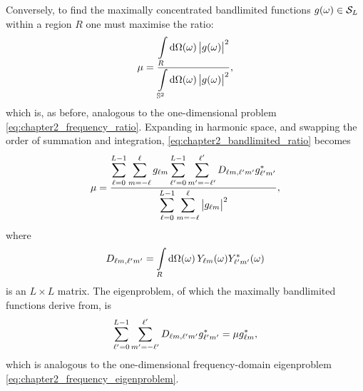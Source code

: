 Conversely, to find the maximally concentrated bandlimited functions \(\pixel{g} \in \spaceBandlimit{}\) within a region \(R\) one must maximise the ratio:
%
\begin{equation}\label{eq:chapter2_bandlimited_ratio}
	\mu
	= \frac{\integrateRegion{\sphereVolume} \abs{\pixel{g}}^{2}}
	{\integrateSphere{\omega} \abs{\pixel{g}}^{2}},
\end{equation}
%
which is, as before, analogous to the one-dimensional problem \cref{eq:chapter2_frequency_ratio}.
Expanding in harmonic space, and swapping the order of summation and integration, \cref{eq:chapter2_bandlimited_ratio} becomes
%
\begin{equation}
	\mu
	= \frac{\displaystyle\sum\limits_{\ell=0}^{L-1} \sum\limits_{m=-\ell}^{\ell} \harmonic{g}
		\sum\limits_{\ell'=0}^{L-1} \sum\limits_{m'=-\ell'}^{\ell'} \Dmatrix \conj{\harmonic[']{g}}}
	{\displaystyle\sum\limits_{\ell=0}^{L-1} \sum\limits_{m=-\ell}^{\ell} \abs{\harmonic{g}}^{2}},
\end{equation}
%
where
%
\begin{equation}
	\Dmatrix
	= \integrateRegion{\sphereVolume} \pixel{\harmonic{Y}} \pixel{\conj{\harmonic[']{Y}}}
\end{equation}
%
is an \(L \times L\) matrix.
The eigenproblem, of which the maximally bandlimited functions derive from, is
%
\begin{equation}
	\sum\limits_{\ell'=0}^{L-1} \sum\limits_{m'=-\ell'}^{\ell'} \Dmatrix \conj{\harmonic[']{g}}
	= \mu \conj{\harmonic{g}},
\end{equation}
%
which is analogous to the one-dimensional frequency-domain eigenproblem \cref{eq:chapter2_frequency_eigenproblem}.

